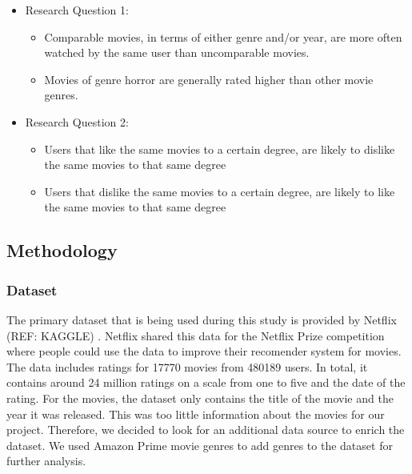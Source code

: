 \documentclass[
  english,
  man,floatsintext]{apa6}
\providecommand{\tightlist}{%
  \setlength{\itemsep}{0pt}\setlength{\parskip}{0pt}}
\begin{document}
\begin{itemize}
\tightlist
\item
  Research Question 1:

  \begin{itemize}
  \tightlist
  \item
    Comparable movies, in terms of either genre and/or year, are more often watched by the same user than uncomparable movies.\\
  \item
    Movies of genre horror are generally rated higher than other movie genres.
  \end{itemize}
\item
  Research Question 2:

  \begin{itemize}
  \tightlist
  \item
    Users that like the same movies to a certain degree, are likely to dislike the same movies to that same degree
  \item
    Users that dislike the same movies to a certain degree, are likely to like the same movies to that same degree
  \end{itemize}
\end{itemize}

\hypertarget{methodology}{%
\subsection{Methodology}\label{methodology}}

\hypertarget{dataset}{%
\subsubsection{Dataset}\label{dataset}}

The primary dataset that is being used during this study is provided by Netflix (REF: KAGGLE) .
Netflix shared this data for the Netflix Prize competition where people could use the data to improve their recomender system for movies.
The data includes ratings for 17770 movies from 480189 users.
In total, it contains around 24 million ratings on a scale from one to five and the date of the rating.
For the movies, the dataset only contains the title of the movie and the year it was released.
This was too little information about the movies for our project.
Therefore, we decided to look for an additional data source to enrich the dataset.
We used Amazon Prime movie genres to add genres to the dataset for further analysis.
\end{document}
